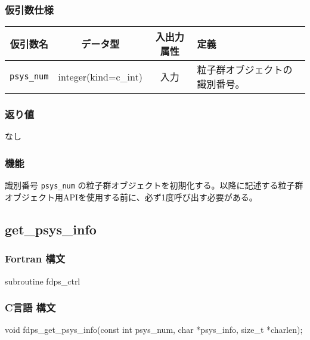 \subsubsection*{仮引数仕様}
\begin{table}[h]
\begin{tabularx}{\linewidth}{cccX}
\toprule
\rowcolor{Snow2}
仮引数名 & データ型 & 入出力属性 & 定義 \\
\midrule
\texttt{psys\_num} & integer(kind=c\_int) & 入力 & 粒子群オブジェクトの識別番号。\\
\bottomrule
\end{tabularx}
\end{table}

\subsubsection*{返り値}
なし

\subsubsection*{機能}
識別番号 \texttt{psys\_num} の粒子群オブジェクトを初期化する。以降に記述する粒子群オブジェクト用APIを使用する前に、必ず1度呼び出す必要がある。

\clearpage

\subsection{get\_psys\_info}
\subsubsection*{Fortran 構文}
\begin{screen}
\begin{spverbatim}
subroutine fdps_ctrl%
\end{spverbatim}
\end{screen}

\subsubsection*{C言語 構文}
\begin{screen}
\begin{spverbatim}
void fdps_get_psys_info(const int psys_num,
                        char *psys_info,
                        size_t *charlen);
\end{spverbatim}
\end{screen}


